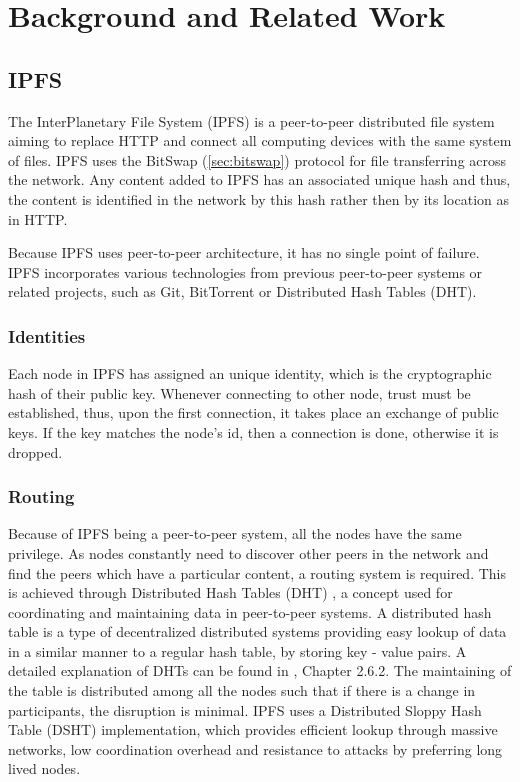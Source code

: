 \documentclass[12pt]{report}
\begin{document}
\chapter{Background and Related Work}

\section{IPFS}
\label{sec:ipfs}

The InterPlanetary File System (IPFS) \cite{ipfs} is a peer-to-peer distributed file system aiming to replace HTTP and connect all computing devices with the same system of files. IPFS uses the BitSwap (\ref{sec:bitswap}) protocol for file transferring across the network. Any content added to IPFS has an associated unique hash and thus, the content is identified in the network by this hash rather then by its location as in HTTP. 

Because IPFS uses peer-to-peer architecture, it has no single point of failure. IPFS incorporates various technologies from previous peer-to-peer systems or related projects, such as Git, BitTorrent or Distributed Hash Tables (DHT).

\subsection{Identities}
Each node in IPFS has assigned an unique identity, which is the cryptographic hash of their public key. Whenever connecting to other node, trust must be established, thus, upon the first connection, it takes place an exchange of public keys. If the key matches the node's id, then a connection is done, otherwise it is dropped. 

\subsection{Routing}
Because of IPFS being a peer-to-peer system, all the nodes have the same privilege. As nodes constantly need to discover other peers in the network and find the peers which have a particular content, a routing system is required. This is achieved through Distributed Hash Tables (DHT) \cite{compnet}, a concept used for coordinating and maintaining data in peer-to-peer systems. A distributed hash table is a type of decentralized distributed systems providing easy lookup of data in a similar manner to a regular hash table, by storing key - value pairs. A detailed explanation of DHTs can be found in \cite{compnet}, Chapter 2.6.2. The maintaining of the table is distributed among all the nodes such that if there is a change in participants, the disruption is minimal. IPFS uses a Distributed Sloppy Hash Table (DSHT) implementation, which provides efficient lookup through massive networks, low coordination overhead and resistance to attacks by preferring long lived nodes.
\end{document}
